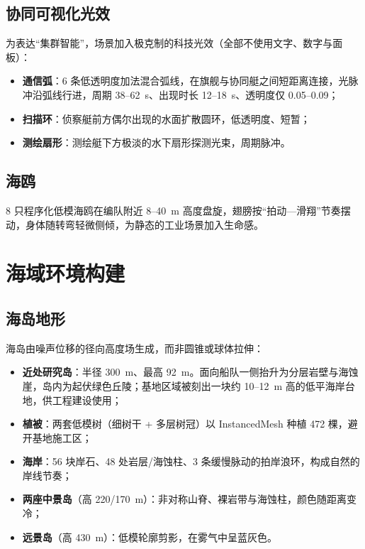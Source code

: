 \documentclass[UTF8, a4paper, 11pt]{ctexart}
\begin{document}
\subsection{协同可视化光效}

为表达“集群智能”，场景加入极克制的科技光效（全部不使用文字、数字与面板）：

\begin{itemize}
  \item \textbf{通信弧}：6 条低透明度加法混合弧线，在旗舰与协同艇之间短距离连接，光脉冲沿弧线行进，周期 38--62~s、出现时长 12--18~s、透明度仅 0.05--0.09；
  \item \textbf{扫描环}：侦察艇前方偶尔出现的水面扩散圆环，低透明度、短暂；
  \item \textbf{测绘扇形}：测绘艇下方极淡的水下扇形探测光束，周期脉冲。
\end{itemize}

\subsection{海鸥}

8 只程序化低模海鸥在编队附近 8--40~m 高度盘旋，翅膀按“拍动—滑翔”节奏摆动，身体随转弯轻微侧倾，为静态的工业场景加入生命感。

\section{海域环境构建}

\subsection{海岛地形}

海岛由噪声位移的径向高度场生成，而非圆锥或球体拉伸：

\begin{itemize}
  \item \textbf{近处研究岛}：半径 300~m、最高 92~m。面向船队一侧抬升为分层岩壁与海蚀崖，岛内为起伏绿色丘陵；基地区域被刻出一块约 10--12~m 高的低平海岸台地，供工程建设使用；
  \item \textbf{植被}：两套低模树（细树干 + 多层树冠）以 InstancedMesh 种植 472 棵，避开基地施工区；
  \item \textbf{海岸}：56 块岸石、48 处岩层/海蚀柱、3 条缓慢脉动的拍岸浪环，构成自然的岸线节奏；
  \item \textbf{两座中景岛}（高 220/170~m）：非对称山脊、裸岩带与海蚀柱，颜色随距离变冷；
  \item \textbf{远景岛}（高 430~m）：低模轮廓剪影，在雾气中呈蓝灰色。
\end{itemize}
\end{document}
